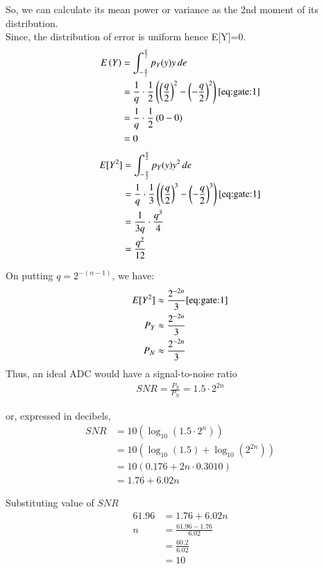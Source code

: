 \documentclass[journal,12pt,onecolumn]{IEEEtran}
\begin{document}
So, we can calculate its mean power or variance as the 2nd moment of its distribution.\\
Since, the distribution of error is uniform hence E[Y]=0.\\
\begin{align}
E\left(Y\right) &= \int_{-\frac{q}{2}}^{\frac{q}{2}} p_Y(y) y \, de \\
&= \frac{1}{q} \cdot \frac{1}{2} \left(\left(\frac{q}{2}\right)^{2} - \left(-\frac{q}{2}\right)^{2}\right) \ref{eq:gate:1} \\
&= \frac{1}{q} \cdot \frac{1}{2} \left(0 - 0\right)\\
&= 0
\end{align}
\begin{align} 
E[Y^{2}] &= \int_{-\frac{q}{2}}^{\frac{q}{2}} p_Y(y) y^{2} \, de \\
&= \frac{1}{q} \cdot \frac{1}{3} \left(\left(\frac{q}{2}\right)^{3} - \left(-\frac{q}{2}\right)^{3}\right)  \ref{eq:gate:1} \\
&=\frac{1}{3q} \cdot \frac{q^{3}}{4}\\
&=\frac{q^{2}}{12}\\
\end{align}

On putting \(q = 2^{-(n-1)}\), we have:
\begin{align}
E[Y^{2}] &\approx \frac{2^{-2n}}{3} \ref{eq:gate:1} \\
P_Y &\approx \frac{2^{-2n}}{3}\\
P_N &\approx \frac{2^{-2n}}{3}\\
\end{align}
Thus, an ideal ADC would have a signal-to-noise ratio
\begin{align}
SNR = \frac{P_S}{P_N} = 1.5 \cdot 2^{2n}
\end{align}

or, expressed in decibels,
\begin{align}
SNR &= 10 \left(\log_{10}(1.5 \cdot 2^{n})\right)\\
&= 10 \left(\log_{10}(1.5) + \log_{10}(2^{2n})\right)\\
&= 10 \left(0.176 + 2n \cdot 0.3010\right)\\
&= 1.76 + 6.02n
\end{align}

Substituting value of $SNR$
\begin{align}
61.96 &= 1.76 +6.02n \\
n &= \frac{61.96 -1.76}{6.02}\\
&= \frac{60.2}{6.02}\\
&= 10
\end{align}
\end{document}
